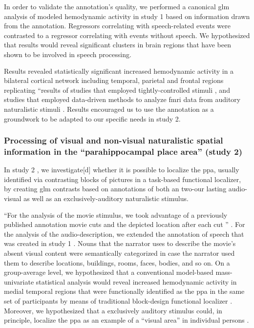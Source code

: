 In order to validate the annotation's quality, we performed a canonical \ac{glm}
analysis of modeled hemodynamic activity in study 1 based on information drawn
from the annotation.
Regressors correlating with speech-related events were contrasted to a regressor
correlating with events without speech.
We hypothesized that results would reveal significant clusters in brain regions
that have been shown to be involved in speech processing.

Results revealed statistically significant increased hemodynamic activity in a
bilateral cortical network including temporal, parietal and frontal regions
replicating ``results of studies that employed tightly-controlled stimuli
\citep[s.][for reviews]{friederici2011brain,
hickok2007cortical,price2012twentyyears}, and studies that employed data-driven
methods to analyze \ac{fmri} data from auditory naturalistic stimuli
\citep{honey2012not, lerner2011topographic, silbert2014coupled}.
Results encouraged us to use the annotation as a groundwork to be adapted to our
specific needs in study 2.


\subsubsection{Processing of visual and non-visual naturalistic spatial
information in the ``parahippocampal place area'' (study 2)}

In study 2 \citep{haeusler2022processing}, we investigate[d] whether it is
possible to localize the \ac{ppa}, usually identified via contrasting blocks of
pictures in a task-based functional localizer, by creating \ac{glm} contrasts
based on annotations of both an two-our lasting audio-visual as well as an
exclusively-auditory naturalistic stimulus.

``For the analysis of the movie stimulus, we took advantage of a previously
published annotation movie cuts and the depicted location after each cut
\citep{haeusler2016cutanno}'' \citep{haeusler2022processing}.
For the analysis of the audio-description, we extended the annotation of speech
that was created in study 1 \citep{haeusler2021speechanno}.
%
Nouns that the narrator uses to describe the movie's absent visual content were
semantically categorized in case the narrator used them to describe locations,
buildings, rooms, faces, bodies, and so on.
On a group-average level, we hypothesized that a conventional model-based
mass-univariate statistical analysis would reveal increased hemodynamic activity
in medial temporal regions that were functionally identified as the \ac{ppa} in
the same set of participants by means of traditional block-design functional
localizer \citep{sengupta2016extension}.
Moreover, we hypothesized that a exclusively auditory stimulus could, in
principle, localize the \ac{ppa} as an example of a ``visual area'' in
individual persons \citep{haeusler2022processing}.


